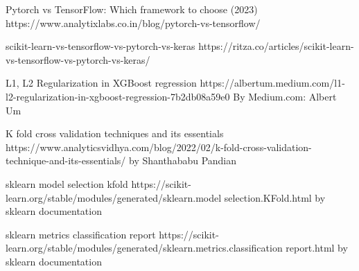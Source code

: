 \documentclass[11pt, a4paper]{article}
\begin{document}
\begin{thebibliography}{9}
Pytorch vs TensorFlow: Which framework to choose (2023)
https://www.analytixlabs.co.in/blog/pytorch-vs-tensorflow/

scikit-learn-vs-tensorflow-vs-pytorch-vs-keras
https://ritza.co/articles/scikit-learn-vs-tensorflow-vs-pytorch-vs-keras/

L1, L2 Regularization in XGBoost regression
https://albertum.medium.com/l1-l2-regularization-in-xgboost-regression-7b2db08a59e0
By Medium.com: Albert Um

K fold cross validation techniques and its essentials
https://www.analyticsvidhya.com/blog/2022/02/k-fold-cross-validation-technique-and-its-essentials/
by Shanthababu Pandian

sklearn model selection kfold
https://scikit-learn.org/stable/modules/generated/sklearn.model selection.KFold.html
by sklearn documentation

sklearn metrics classification report
https://scikit-learn.org/stable/modules/generated/sklearn.metrics.classification report.html
by sklearn documentation

\end{thebibliography}
\end{document}

